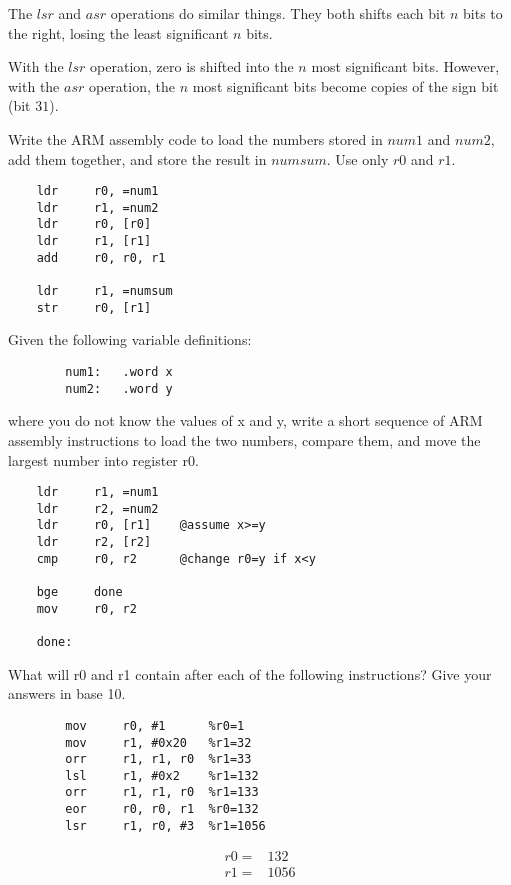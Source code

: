 \documentclass[12pt]{article}
\newenvironment{solution}[2][Solution]{\begin{trivlist}
\item[\hskip \labelsep {\bfseries #1}]}{\end{trivlist}}
\newenvironment{problem}[2][Problem]{\begin{trivlist}
\item[\hskip \labelsep {\bfseries #1}\hskip \labelsep {\bfseries #2.}]}{\end{trivlist}}
\begin{document}
The $lsr$ and $asr$ operations do similar things. They both shifts each bit $n$ bits to the right, losing the least significant $n$ bits.

With the $lsr$ operation, zero is shifted into the $n$ most significant bits.
However, with the $asr$ operation, the $n$ most significant bits become copies of the sign bit (bit $31$).


\begin{problem}{4.4}
    Write the ARM assembly code to load the numbers stored in $num1$ and $num2$, add them together, and store the result in $numsum$. Use only $r0$ and $r1$.
\end{problem}

\begin{verbatim}
    ldr     r0, =num1
    ldr     r1, =num2
    ldr     r0, [r0]
    ldr     r1, [r1]
    add     r0, r0, r1
    
    ldr     r1, =numsum
    str     r0, [r1]
\end{verbatim}


\begin{problem}{4.5}
    Given the following variable definitions:
    \begin{verbatim}
        num1:   .word x
        num2:   .word y
    \end{verbatim}
    where you do not know the values of x and y, write a short sequence of ARM assembly instructions to load the two numbers, compare them, and move the largest number into register r0.
\end{problem}

\begin{verbatim}
    ldr     r1, =num1
    ldr     r2, =num2
    ldr     r0, [r1]    @assume x>=y
    ldr     r2, [r2]
    cmp     r0, r2      @change r0=y if x<y

    bge     done
    mov     r0, r2

    done:
\end{verbatim}


\begin{problem}{4.6}
    What will r0 and r1 contain after each of the following instructions? Give your answers in base 10.
    \begin{verbatim}
        mov     r0, #1      %r0=1
        mov     r1, #0x20   %r1=32
        orr     r1, r1, r0  %r1=33
        lsl     r1, #0x2    %r1=132
        orr     r1, r1, r0  %r1=133
        eor     r0, r0, r1  %r0=132
        lsr     r1, r0, #3  %r1=1056
    \end{verbatim}

\end{problem}

\begin{solution}{}
    \begin{align*}
        r0 = & 132 \\
        r1 = & 1056
    \end{align*}
\end{solution}
\end{document}
